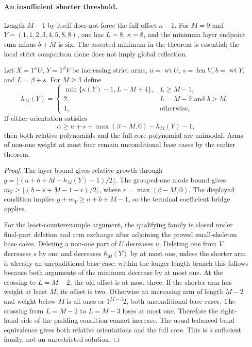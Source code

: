 \paragraph{An insufficient shorter threshold.}
Length $M-1$ by itself does not force the full offset
$\kappa-1$. For $M=9$ and $Y=(1,1,2,3,4,5,8,8)$, one has
$L=8$, $\kappa=8$, and the minimum layer endpoint sum minus
$b+M$ is six. The asserted minimum in the theorem is essential;
the local strict comparison alone does not imply global reflection.

\begin{theorem}
Let $X=1^\alpha U$, $Y=1^\beta V$ be increasing strict arms,
$u=\operatorname{wt}U$, $s=\operatorname{len}V$,
$b=\operatorname{wt}Y$, and $L=\beta+s$.
For $M\ge3$ define
\[
 h_M(Y)=
 \begin{cases}
  \min\{\kappa(Y)-1,L-M+4\},&L\ge M-1,\\
  2,&L=M-2\text{ and }b\ge M,\\
  1,&\text{otherwise},
 \end{cases}
\]
If either orientation satisfies
\[
 \alpha\ge u+s+\max(\beta-M,0)-h_M(Y)-1,
\]
then both relative polynomials and the full core polynomial
are unimodal. Arms of non-one weight at most four remain
unconditional base cases by the earlier theorem.
\end{theorem}
\begin{proof}
The layer bound gives relative growth through
$g=\lfloor(a+b+M+h_M(Y)+1)/2\rfloor$.
The grouped-one mode bound gives
$m_Y\ge\lfloor(b-s+M-1-r)/2\rfloor$, where
$r=\max(\beta-M,0)$. The displayed condition implies
$g+m_Y\ge u+b+M-1$, so the terminal coefficient bridge applies.

For the least-counterexample argument, the qualifying family is
closed under final-part deletion and arm exchange after adjoining
the proved small-skeleton base cases. Deleting a
non-one part of $U$ decreases $u$. Deleting one from $V$
decreases $s$ by one and decreases $h_M(Y)$ by at most one,
unless the shorter arm is already an unconditional base case:
within the longer-length branch this follows because both
arguments of the minimum decrease by at most one. At the crossing
to $L=M-2$, the old offset is at most three. If the shorter arm
has weight at least $M$, its offset is two. Otherwise an increasing
arm of length $M-2$ and weight below $M$ is all ones or
$1^{M-3}2$, both unconditional base cases. The crossing from
$L=M-2$ to $L=M-3$ loses at most one. Therefore the right-hand side
of the padding condition cannot increase. The usual balanced-band
equivalence gives both relative orientations and the full core.
This is a sufficient family, not an unrestricted solution.
\end{proof}
